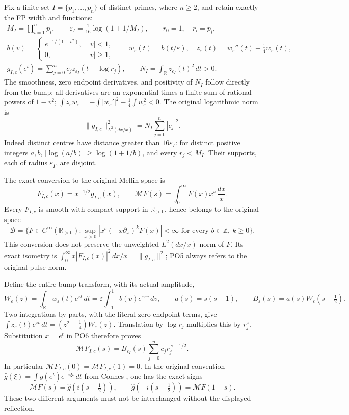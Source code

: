 \documentclass[11pt]{article}
\newcommand{\R}{\mathbb R}
\newcommand{\B}{\mathscr B}
\newcommand{\M}{\mathcal M}
\newcommand{\eps}{\varepsilon}
\begin{document}
Fix a finite set \(I=\{p_1,\ldots,p_n\}\) of distinct primes,
where \(n\ge2\), and retain exactly the FP width and functions:
\[
 \begin{gathered}
 M_I=\prod_{i=1}^np_i,\qquad
 \eps_I=\frac1{16}\log(1+1/M_I),\qquad r_0=1,\quad r_i=p_i,\\
 b(v)=
 \begin{cases}e^{-1/(1-v^2)},&|v|<1,\\0,&|v|\ge1,\end{cases}
 \qquad
 w_\eps(t)=b(t/\eps),\quad
 z_\eps(t)=w_\eps''(t)-\frac14w_\eps(t),\\
 g_{I,c}(e^t)=\sum_{j=0}^n c_jz_{\eps_I}(t-\log r_j),
 \qquad
 N_I=\int_\R z_{\eps_I}(t)^2\,dt>0 .
 \end{gathered}
 \tag{PO4}\label{po:pulse}
\]
The smoothness, zero endpoint derivatives, and positivity of \(N_I\)
follow directly from the bump: all derivatives are an exponential
times a finite sum of rational powers of \(1-v^2\);
\(\int z_\eps w_\eps=-\int|w_\eps'|^2-\tfrac14\int w_\eps^2<0\).
The original logarithmic norm is
\[
 \|g_{I,c}\|_{L^2(dx/x)}^2=N_I\sum_{j=0}^n|c_j|^2 .
 \tag{PO5}\label{po:norm}
\]
Indeed distinct centres have distance greater than \(16\eps_I\):
for distinct positive integers \(a,b\),
\(|\log(a/b)|\ge\log(1+1/b)\), and every \(r_j<M_I\).
Their supports, each of radius \(\eps_I\), are disjoint.

The exact conversion to the original Mellin space is
\[
 F_{I,c}(x)=x^{-1/2}g_{I,c}(x),\qquad
 \M F(s)=\int_0^\infty F(x)x^s\,\frac{dx}{x}.
 \tag{PO6}\label{po:conversion}
\]
Every \(F_{I,c}\) is smooth with compact support in
\(\R_{>0}\), hence belongs to the original space
\[
 \B=\{F\in C^\infty(\R_{>0}):
       \sup_{x>0}|x^b(-x\partial_x)^kF(x)|<\infty
                \text{ for every }b\in\mathbb Z,\ k\ge0\}.
 \tag{PO7}
\]
This conversion does not preserve the unweighted \(L^2(dx/x)\)
norm of \(F\). Its exact isometry is
\(\int_0^\infty x|F_{I,c}(x)|^2\,dx/x=\|g_{I,c}\|^2\);
PO5 always refers to the original pulse norm.

Define the entire bump transform, with its actual amplitude,
\[
 W_\eps(z)=\int_\R w_\eps(t)e^{zt}\,dt
     =\eps\int_{-1}^1 b(v)e^{\eps zv}\,dv,\qquad
 a(s)=s(s-1),\qquad B_\eps(s)=a(s)W_\eps(s-\tfrac12).
 \tag{PO8}\label{po:bump}
\]
Two integrations by parts, with the literal zero endpoint terms,
give \(\int z_\eps(t)e^{zt}\,dt=(z^2-\tfrac14)W_\eps(z)\).
Translation by \(\log r_j\) multiplies this by \(r_j^z\).
Substitution \(x=e^t\) in PO6 therefore proves
\[
 \boxed{\quad
 \M F_{I,c}(s)=B_{\eps_I}(s)
             \sum_{j=0}^n c_j r_j^{\,s-1/2}.
 \quad}
 \tag{PO9}\label{po:transform}
\]
In particular \(\M F_{I,c}(0)=\M F_{I,c}(1)=0\).
In the original convention
\(\widehat g(\xi)=\int g(e^t)e^{-i\xi t}\,dt\) from
Connes \cite{Connes}, one has the exact signs
\[
 \M F(s)=\widehat g(i(s-\tfrac12)),\qquad
 \widehat g(-i(s-\tfrac12))=\M F(1-s).
 \tag{PO10}\label{po:Fourier}
\]
These two different arguments must not be interchanged without
the displayed reflection.
\end{document}
